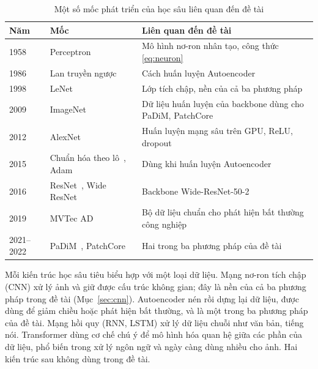\begin{table}[htbp]
  \centering
  \caption{Một số mốc phát triển của học sâu liên quan đến đề tài}
  \label{tab:moc-dl}
  \small
  \begin{tabular}{@{}l >{\raggedright\arraybackslash}p{5.6cm} >{\raggedright\arraybackslash}p{7.2cm}@{}}
    \toprule
    Năm & Mốc & Liên quan đến đề tài \\
    \midrule
    1958 & Perceptron~\cite{rosenblattPerceptronProbabilisticModel1958} & Mô hình nơ-ron nhân tạo, công thức
      \eqref{eq:neuron} \\
    1986 & Lan truyền ngược~\cite{rumelhartLearningRepresentationsBackpropagating1986} & Cách huấn luyện Autoencoder \\
    1998 & LeNet~\cite{lecunGradientbasedLearningApplied1998} & Lớp tích chập, nền của cả ba phương pháp \\
    2009 & ImageNet~\cite{dengImageNetLargescaleHierarchical2009} & Dữ liệu huấn luyện của backbone dùng cho PaDiM,
      PatchCore \\
    2012 & AlexNet~\cite{krizhevskyImageNetClassificationDeep2012} & Huấn luyện mạng sâu trên GPU, ReLU, dropout \\
    2015 & Chuẩn hóa theo lô~\cite{ioffeBatchNormalizationAccelerating2015}, Adam~\cite{kingmaAdamMethodStochastic2015}
      & Dùng khi huấn luyện Autoencoder \\
    2016 & ResNet~\cite{heDeepResidualLearning2016}, Wide ResNet~\cite{zagoruykoWideResidualNetworks2016} & Backbone
      Wide-ResNet-50-2 \\
    2019 & MVTec AD~\cite{bergmannMVTecADComprehensive2019} & Bộ dữ liệu chuẩn cho phát hiện bất thường công nghiệp \\
    2021--2022 & PaDiM~\cite{defardPaDiMPatchDistribution2021}, PatchCore~\cite{rothTotalRecallIndustrial2022} &
      Hai trong ba phương pháp của đề tài \\
    \bottomrule
  \end{tabular}
\end{table}

Mỗi kiến trúc học sâu tiêu biểu hợp với một loại dữ liệu. Mạng nơ-ron tích chập (CNN) xử lý ảnh và giữ được cấu trúc
không gian; đây là nền của cả ba phương pháp trong đề tài (Mục~\ref{sec:cnn}). Autoencoder nén rồi dựng lại dữ liệu,
được dùng để giảm chiều hoặc phát hiện bất thường, và là một trong ba phương pháp của đề tài. Mạng hồi quy (RNN,
LSTM) xử lý dữ liệu chuỗi như văn bản, tiếng nói. Transformer dùng cơ chế chú ý để mô hình hóa quan hệ giữa các phần
của dữ liệu, phổ biến trong xử lý ngôn ngữ và ngày càng dùng nhiều cho ảnh. Hai kiến trúc sau không dùng trong đề tài.

